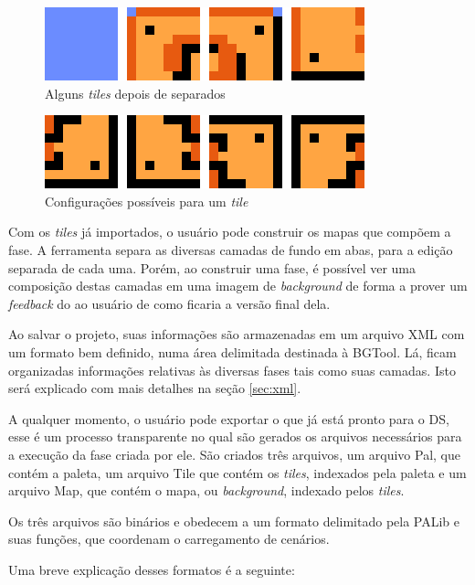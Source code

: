\documentclass[brazil]{abnt}
\begin{document}
\begin{figure}[h!]
\centering
\includegraphics[scale=1]{imgs/tiles1.png}
\caption{Alguns \textit{tiles} depois de separados} 
\end{figure}

\begin{figure}[h!]
\centering
\includegraphics[scale=1]{imgs/tiles2.png}
\caption{Configurações possíveis para um \textit{tile}} 
\end{figure}

Com os \textit{tiles} já importados, o usuário pode construir os mapas que compõem a fase. A ferramenta separa as diversas camadas de fundo em abas, para a edição separada de cada uma. Porém, ao construir uma fase, é possível ver uma composição destas camadas em uma imagem de \textit{background} de forma a prover um \textit{feedback} do ao usuário de como ficaria a versão final dela.

Ao salvar o projeto, suas informações são armazenadas em um arquivo XML com um formato bem definido, numa área delimitada destinada à BGTool. Lá, ficam organizadas informações relativas às diversas fases tais como suas camadas. Isto será explicado com mais detalhes na seção \ref{sec:xml}.

A qualquer momento, o usuário pode exportar o que já está pronto para o DS, esse é um processo transparente no qual são gerados os arquivos necessários para a execução da fase criada por ele. São criados três arquivos, um arquivo Pal, que contém a paleta, um arquivo Tile que contém os \textit{tiles}, indexados pela paleta e um arquivo Map, que contém o mapa, ou \textit{background}, indexado pelos \textit{tiles}.
 
Os três arquivos são binários e obedecem a um formato delimitado pela PALib e suas funções, que coordenam o carregamento de cenários.

Uma breve explicação desses formatos é a seguinte:
\end{document}
